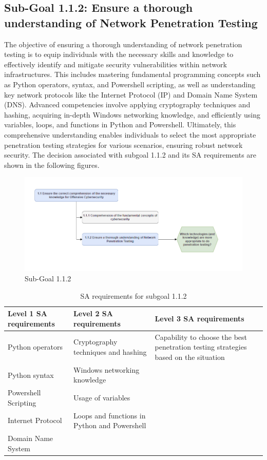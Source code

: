 \newpage
\subsection{Sub-Goal 1.1.2: Ensure a thorough understanding of Network Penetration Testing}
The objective of ensuring a thorough understanding of network penetration testing is to equip individuals with the necessary skills and knowledge to effectively identify and mitigate security vulnerabilities within network infrastructures. This includes mastering fundamental programming concepts such as Python operators, syntax, and Powershell scripting, as well as understanding key network protocols like the Internet Protocol (IP) and Domain Name System (DNS). Advanced competencies involve applying cryptography techniques and hashing, acquiring in-depth Windows networking knowledge, and efficiently using variables, loops, and functions in Python and Powershell. Ultimately, this comprehensive understanding enables individuals to select the most appropriate penetration testing strategies for various scenarios, ensuring robust network security.
The decision associated with subgoal 1.1.2 and its SA requirements are shown in the following figures.
\begin{figure}[H]
    \centering
    \includegraphics[width=\textwidth]{./assets/subgoal_1.1.2.png}
    \caption{Sub-Goal 1.1.2}
    \label{fig:subgoal_1.1.2}
\end{figure}

\begin{table}[H]
    \begin{center}
    \begin{tabular}{ | m{5cm} | m{5cm}| m{5cm} | } 
      \hline
      \textbf{Level 1 SA requirements} & \textbf{Level 2 SA requirements}  & \textbf{Level 3 SA requirements}  \\ 
      \hline
      Python operators & Cryptography techniques and hashing & Capability to choose the best penetration testing strategies based on the situation\\ 
      \hline
      Python syntax & Windows networking knowledge & \\ 
      \hline
      Powershell Scripting & Usage of variables & \\ 
      \hline
      Internet Protocol & Loops and functions in Python and Powershell  & \\ 
      \hline
      Domain Name System &  & \\ 
      \hline
    \end{tabular}
    \end{center}
    \caption{SA requirements for subgoal 1.1.2}
    \end{table}

